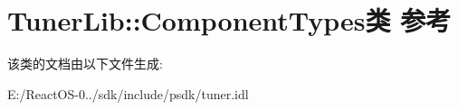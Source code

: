 \hypertarget{class_tuner_lib_1_1_component_types}{}\section{Tuner\+Lib\+:\+:Component\+Types类 参考}
\label{class_tuner_lib_1_1_component_types}


该类的文档由以下文件生成\+:\begin{DoxyCompactItemize}
\item 
E\+:/\+React\+O\+S-\/0../sdk/include/psdk/tuner.\+idl\end{DoxyCompactItemize}
